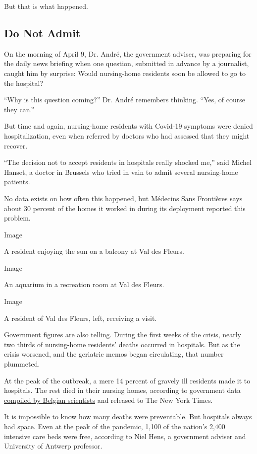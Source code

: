 But that is what happened.

\hypertarget{do-not-admit}{%
\subsection{Do Not Admit}\label{do-not-admit}}

On the morning of April 9, Dr. André, the government adviser, was
preparing for the daily news briefing when one question, submitted in
advance by a journalist, caught him by surprise: Would nursing-home
residents soon be allowed to go to the hospital?

``Why is this question coming?'' Dr. André remembers thinking. ``Yes, of
course they can.''

But time and again, nursing-home residents with Covid-19 symptoms were
denied hospitalization, even when referred by doctors who had assessed
that they might recover.

``The decision not to accept residents in hospitals really shocked me,''
said Michel Hanset, a doctor in Brussels who tried in vain to admit
several nursing-home patients.

No data exists on how often this happened, but Médecins Sans Frontières
says about 30 percent of the homes it worked in during its deployment
reported this problem.

Image

A resident enjoying the sun on a balcony at Val des Fleurs.

Image

An aquarium in a recreation room at Val des Fleurs.

Image

A resident of Val des Fleurs, left, receiving a visit.

Government figures are also telling. During the first weeks of the
crisis, nearly two thirds of nursing-home residents' deaths occurred in
hospitals. But as the crisis worsened, and the geriatric memos began
circulating, that number plummeted.

At the peak of the outbreak, a mere 14 percent of gravely ill residents
made it to hospitals. The rest died in their nursing homes, according to
government data
\href{https://www.medrxiv.org/content/10.1101/2020.06.20.20136234v1}{compiled
by Belgian scientists} and released to The New York Times.

It is impossible to know how many deaths were preventable. But hospitals
always had space. Even at the peak of the pandemic, 1,100 of the
nation's 2,400 intensive care beds were free, according to Niel Hens, a
government adviser and University of Antwerp professor.

